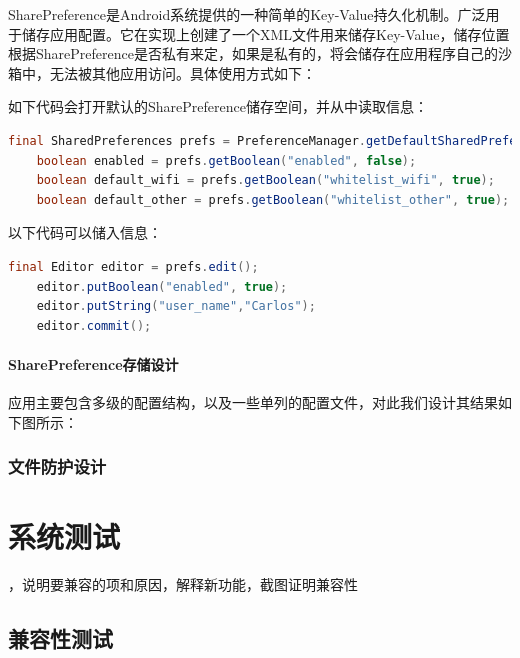 \documentclass[format=final, language=chinese, degree=fyp]{hustthesis}
\begin{document}
SharePreference是Android系统提供的一种简单的Key-Value持久化机制。广泛用于储存应用配置。它在实现上创建了一个XML文件用来储存Key-Value，储存位置根据SharePreference是否私有来定，如果是私有的，将会储存在应用程序自己的沙箱中，无法被其他应用访问。具体使用方式如下：

如下代码会打开默认的SharePreference储存空间，并从中读取信息：

\begin{lstlisting}[language=java]
    final SharedPreferences prefs = PreferenceManager.getDefaultSharedPreferences(this);
    boolean enabled = prefs.getBoolean("enabled", false);
    boolean default_wifi = prefs.getBoolean("whitelist_wifi", true);
    boolean default_other = prefs.getBoolean("whitelist_other", true);
\end{lstlisting}

以下代码可以储入信息：

\begin{lstlisting}[language=java]
    final Editor editor = prefs.edit();
    editor.putBoolean("enabled", true);
    editor.putString("user_name","Carlos");
    editor.commit();
\end{lstlisting}

\subsubsection{SharePreference存储设计}

应用主要包含多级的配置结构，以及一些单列的配置文件，对此我们设计其结果如下图所示：




\subsection{文件防护设计}




\chapter{系统测试}

，说明要兼容的项和原因，解释新功能，截图证明兼容性

\section{兼容性测试}
\end{document}
